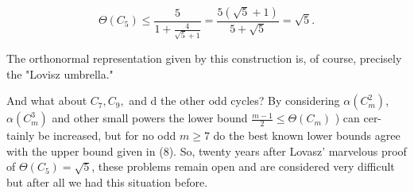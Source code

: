 \documentclass[openany,12pt]{memoir}
\begin{document}
\[
\Theta(C_5) \leq {\frac{5}{1 + {\frac{4}{\sqrt{5}+1}}}}={\frac{5(\sqrt{5}+1)}{5+\sqrt{5}}} = \sqrt{5}.
\]

The orthonormal representation given by this construction is, of course, 
precisely the "Lovisz umbrella."\\


And what about $C_7, C_9,$ and d the other odd cycles? By considering $\alpha(C_m^2)$,
$\alpha(C_m^3)$ and other small powers the lower bound ${\frac{m-1}{2}} \leq \Theta(C_m)$ ) can cer-
tainly be increased, but for no odd $m \geq 7$  do the best known lower bounds
agree with the upper bound given in (8). So, twenty years after Lovasz' 
marvelous proof of $\Theta(C_5) = \sqrt{5}$, these problems remain open and are 
considered very difficult \text{---} but after all we had this situation before.
\end{document}
